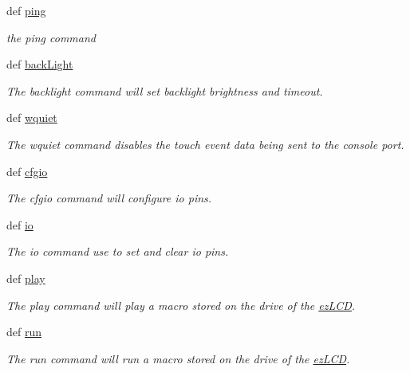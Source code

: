 \begin{DoxyCompactItemize}
def \hyperlink{group___general_ga123be6aba6fc316922b71e3fe1bc7aaf}{ping}
\begin{DoxyCompactList}\small\item\em the ping command \end{DoxyCompactList}\item 
def \hyperlink{group___general_ga6205864c6ae16c5fbce932315573c550}{back\-Light}
\begin{DoxyCompactList}\small\item\em The backlight command will set backlight brightness and timeout. \end{DoxyCompactList}\item 
def \hyperlink{group___general_gae760b8839f85e30c2a294a593e77b9d7}{wquiet}
\begin{DoxyCompactList}\small\item\em The wquiet command disables the touch event data being sent to the console port. \end{DoxyCompactList}\item 
def \hyperlink{group___general_ga84837123679c1b262b8bb29108019dda}{cfgio}
\begin{DoxyCompactList}\small\item\em The cfgio command will configure io pins. \end{DoxyCompactList}\item 
def \hyperlink{group___general_gad7ece2d1355d0be3f7df9ce216cb5286}{io}
\begin{DoxyCompactList}\small\item\em The io command use to set and clear io pins. \end{DoxyCompactList}\item 
def \hyperlink{group___general_ga7d904406a210cad98e2d762dae76d553}{play}
\begin{DoxyCompactList}\small\item\em The play command will play a macro stored on the drive of the \hyperlink{classmodule_1_1ez_l_c_d3xx_1_1ez_l_c_d}{ez\-L\-C\-D}. \end{DoxyCompactList}\item 
def \hyperlink{group___general_ga0535965cf75c9a6f4f6039a1d1399d81}{run}
\begin{DoxyCompactList}\small\item\em The run command will run a macro stored on the drive of the \hyperlink{classmodule_1_1ez_l_c_d3xx_1_1ez_l_c_d}{ez\-L\-C\-D}. \end{DoxyCompactList}\item 

\end{DoxyCompactItemize}
